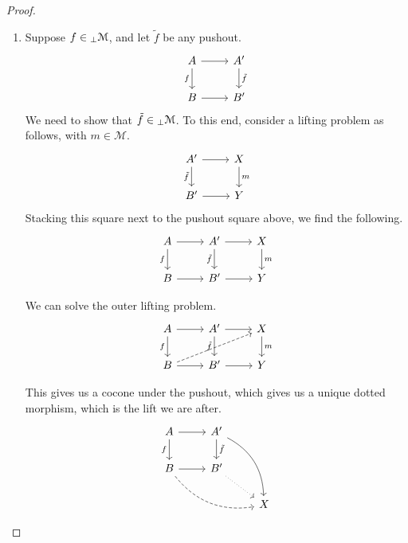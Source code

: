 \documentclass[main.tex]{subfiles}
\begin{document}
\begin{proof}
\begin{enumerate}
    \item Suppose $f \in {}_{\perp}\mathcal{M}$, and let $\tilde{f}$ be any pushout.
      \begin{equation*}
        \begin{tikzcd}
          A
          \arrow[r]
          \arrow[d, swap, "f"]
          & A'
          \arrow[d, "\tilde{f}"]
          \\
          B
          \arrow[r]
          & B'
        \end{tikzcd}
      \end{equation*}
      We need to show that $\tilde{f} \in {}_{\perp}\mathcal{M}$. To this end, consider a lifting problem as follows, with $m \in \mathcal{M}$.
      \begin{equation*}
        \begin{tikzcd}
          A'
          \arrow[r]
          \arrow[d, swap, "\tilde{f}"]
          & X
          \arrow[d, "m"]
          \\
          B'
          \arrow[r]
          & Y
        \end{tikzcd}
      \end{equation*}
      Stacking this square next to the pushout square above, we find the following.
      \begin{equation*}
        \begin{tikzcd}
          A
          \arrow[r]
          \arrow[d, swap, "f"]
          & A'
          \arrow[r]
          \arrow[d, swap, "\tilde{f}"]
          & X
          \arrow[d, "m"]
          \\
          B
          \arrow[r]
          & B'
          \arrow[r]
          & Y
        \end{tikzcd}
      \end{equation*}

      We can solve the outer lifting problem.
      \begin{equation*}
        \begin{tikzcd}
          A
          \arrow[r]
          \arrow[d, swap, "f"]
          & A'
          \arrow[r]
          \arrow[d, swap, "\tilde{f}"]
          & X
          \arrow[d, "m"]
          \\
          B
          \arrow[urr, dashed]
          \arrow[r]
          & B'
          \arrow[r]
          & Y
        \end{tikzcd}
      \end{equation*}

      This gives us a cocone under the pushout, which gives us a unique dotted morphism, which is the lift we are after.
      \begin{equation*}
        \begin{tikzcd}
          A
          \arrow[r]
          \arrow[d, swap, "f"]
          & A'
          \arrow[d, "\tilde{f}"]
          \arrow[ddr, bend left]
          \\
          B
          \arrow[drr, bend right, dashed]
          \arrow[r]
          & B'
          \arrow[dr, dotted]
          \\
          && X
        \end{tikzcd}
      \end{equation*}


\end{enumerate}
\end{proof}
\end{document}
